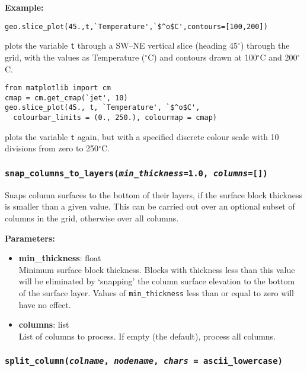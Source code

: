 \textbf{Example:}

\begin{verbatim}
geo.slice_plot(45.,t,`Temperature',`$^o$C',contours=[100,200])
\end{verbatim}

plots the variable \texttt{t} through a SW--NE vertical slice (heading 45$^{\circ}$) through the grid, with the values as Temperature ($^{\circ}$C) and contours drawn at 100$^{\circ}$C and 200$^{\circ}$C.

\begin{verbatim}
from matplotlib import cm
cmap = cm.get_cmap(`jet', 10)
geo.slice_plot(45., t, `Temperature', `$^o$C',
  colourbar_limits = (0., 250.), colourmap = cmap)
\end{verbatim}

plots the variable \texttt{t} again, but with a specified discrete colour scale with 10 divisions from zero to 250$^{\circ}$C.

\subsubsection{\texttt{snap\_columns\_to\_layers(\emph{min\_thickness}=1.0, \emph{columns}=[])}}
\label{sec:snap_columns_to_layers}

Snaps column surfaces to the bottom of their layers, if the surface block thickness is smaller than a given value.  This can be carried out over an optional subset of columns in the grid, otherwise over all columns.

\textbf{Parameters:}
\begin{itemize}
\item \textbf{min\_thickness}: float\\
  Minimum surface block thickness.  Blocks with thickness less than this value will be eliminated by `snapping' the column surface elevation to the bottom of the surface layer.  Values of \texttt{min\_thickness} less than or equal to zero will have no effect.
\item \textbf{columns}: list\\
  List of columns to process.  If empty (the default), process all columns.
\end{itemize}

\subsubsection{\texttt{split\_column(\emph{colname}, \emph{nodename}, \emph{chars} = ascii\_lowercase)}}
\label{sec:split_column}

